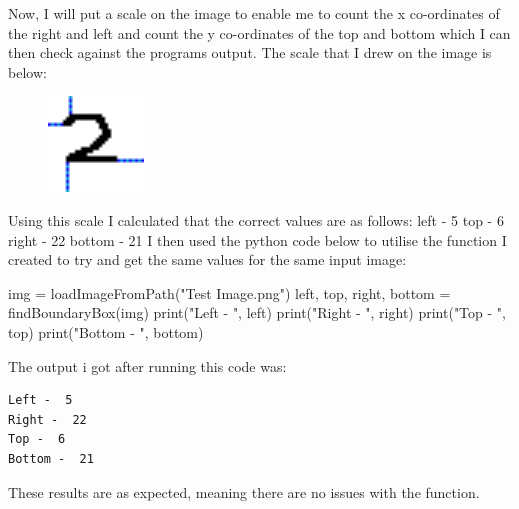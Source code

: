 \documentclass{report}
\begin{document}
\noindent Now, I will put a scale on the image to enable me to count the x co-ordinates of the right and left and count the y co-ordinates of the top and bottom which I can then check against the programs output.
\newline
The scale that I drew on the image is below:
\begin{figure}[H]
    \centering
    \includegraphics[height = 1in]{Images/Development and Testing/Stage 4/Find Bounding Box Testing/Test Image with scale drawn on.png}
    \label{fig:Test Image with Scale}
\end{figure}
\noindent Using this scale I calculated that the correct values are as follows:
\newline
left - 5
\newline
top - 6
\newline
right - 22
\newline
bottom - 21
\newline
I then used the python code below to utilise the function I created to try and get the same values for the same input image:
\begin{python}
img = loadImageFromPath("Test Image.png")
left, top, right, bottom = findBoundaryBox(img)
print("Left - ", left)
print("Right - ", right)
print("Top - ", top)
print("Bottom - ", bottom)
\end{python}
The output i got after running this code was:
\begin{verbatim}
Left -  5
Right -  22
Top -  6
Bottom -  21
\end{verbatim}
These results are as expected, meaning there are no issues with the function.
\newpage
\end{document}
